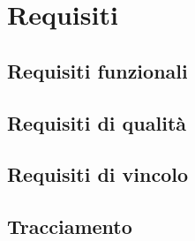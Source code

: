 \documentclass[5pt]{article}
\begin{document}
\fi

\section{Requisiti}
\subsection{Requisiti funzionali}
\subsection{Requisiti di qualità}
\subsection{Requisiti di vincolo}
\subsection{Tracciamento}
\end{document}
